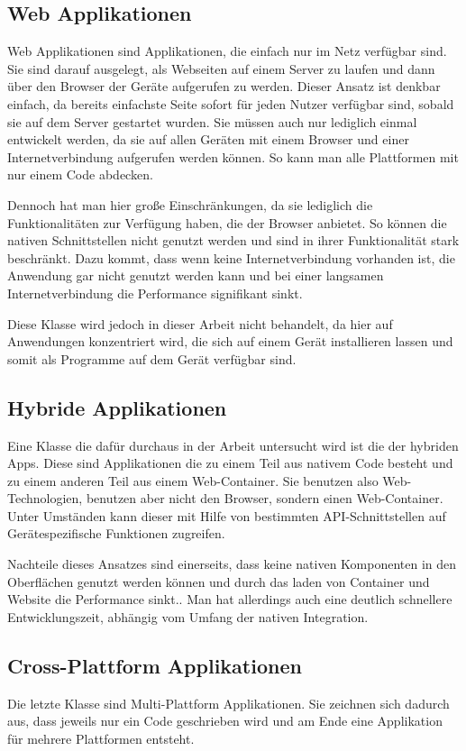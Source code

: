 \subsection{Web Applikationen}
Web Applikationen sind Applikationen, die einfach nur im Netz verfügbar sind. Sie sind darauf ausgelegt, als Webseiten auf einem Server zu laufen und dann über den Browser der Geräte aufgerufen zu werden. Dieser Ansatz ist denkbar einfach, da bereits einfachste Seite sofort für jeden Nutzer verfügbar sind, sobald sie auf dem Server gestartet wurden. Sie müssen auch nur lediglich einmal entwickelt werden, da sie auf allen Geräten mit einem Browser und einer Internetverbindung aufgerufen werden können. So kann man alle Plattformen mit nur einem Code abdecken.\cite{IEEE_development_classes}

Dennoch hat man hier große Einschränkungen, da sie lediglich die Funktionalitäten zur Verfügung haben, die der Browser anbietet. So können die nativen Schnittstellen nicht genutzt werden und sind in ihrer Funktionalität stark beschränkt. Dazu kommt, dass wenn keine Internetverbindung vorhanden ist, die Anwendung gar nicht genutzt werden kann und bei einer langsamen Internetverbindung die Performance signifikant sinkt. 

Diese Klasse wird jedoch in dieser Arbeit nicht behandelt, da hier auf Anwendungen konzentriert wird, die sich auf einem Gerät installieren lassen und somit als Programme auf dem Gerät verfügbar sind.

\subsection{Hybride Applikationen}
Eine Klasse die dafür durchaus in der Arbeit untersucht wird ist die der hybriden Apps. Diese sind Applikationen die zu einem Teil aus nativem Code besteht und zu einem anderen Teil aus einem Web-Container. Sie benutzen also Web-Technologien, benutzen aber nicht den Browser, sondern einen Web-Container. Unter Umständen kann dieser mit Hilfe von bestimmten API-Schnittstellen auf Gerätespezifische Funktionen zugreifen.\cite{IEEE_development_classes}

Nachteile dieses Ansatzes sind einerseits, dass keine nativen Komponenten in den Oberflächen genutzt werden können und durch das laden von Container und Website die Performance sinkt.\cite{IEEE_development_classes}. Man hat allerdings auch eine deutlich schnellere Entwicklungszeit, abhängig vom Umfang der nativen Integration.


\subsection{Cross-Plattform Applikationen}
Die letzte Klasse sind Multi-Plattform Applikationen. Sie zeichnen sich dadurch aus, dass jeweils nur ein Code geschrieben wird und am Ende eine Applikation für mehrere Plattformen entsteht. 

